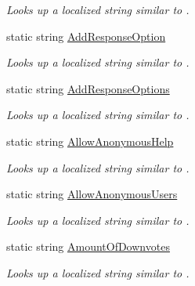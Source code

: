 \begin{DoxyCompactItemize}
\begin{DoxyCompactList}\small\item\em Looks up a localized string similar to . \end{DoxyCompactList}\item 
static string \hyperlink{class_wis_r_1_1_app___resources_1_1_resource_aa51246fef8fb4d050940748dce552d0b}{Add\+Response\+Option}
\begin{DoxyCompactList}\small\item\em Looks up a localized string similar to . \end{DoxyCompactList}\item 
static string \hyperlink{class_wis_r_1_1_app___resources_1_1_resource_a70474b4f447f1c3ad5c4ef4c30eb82f2}{Add\+Response\+Options}
\begin{DoxyCompactList}\small\item\em Looks up a localized string similar to . \end{DoxyCompactList}\item 
static string \hyperlink{class_wis_r_1_1_app___resources_1_1_resource_aacac0806dfb3ea7331d807d0890c6d22}{Allow\+Anonymous\+Help}
\begin{DoxyCompactList}\small\item\em Looks up a localized string similar to . \end{DoxyCompactList}\item 
static string \hyperlink{class_wis_r_1_1_app___resources_1_1_resource_ad4a3736e94c6164a45caa783f53e18cf}{Allow\+Anonymous\+Users}
\begin{DoxyCompactList}\small\item\em Looks up a localized string similar to . \end{DoxyCompactList}\item 
static string \hyperlink{class_wis_r_1_1_app___resources_1_1_resource_abc33b7af2717ff1bb2665365292fe8c0}{Amount\+Of\+Downvotes}
\begin{DoxyCompactList}\small\item\em Looks up a localized string similar to . \end{DoxyCompactList}\item 

\end{DoxyCompactItemize}

